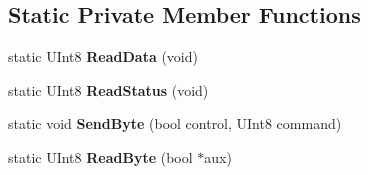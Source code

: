 \subsection*{Static Private Member Functions}
\begin{DoxyCompactItemize}
\item 
\mbox{\label{class_standard_p_c___internal_1_1_p_s2_controller_ac2fc01063fefe1e64ef7935993a8fa55}} 
static U\+Int8 {\bfseries Read\+Data} (void)
\item 
\mbox{\label{class_standard_p_c___internal_1_1_p_s2_controller_a0402a9dee2384014c51569610e0b388d}} 
static U\+Int8 {\bfseries Read\+Status} (void)
\item 
\mbox{\label{class_standard_p_c___internal_1_1_p_s2_controller_afa03a1342e7758e5213e6c88ea0ebf57}} 
static void {\bfseries Send\+Byte} (bool control, U\+Int8 command)
\item 
\mbox{\label{class_standard_p_c___internal_1_1_p_s2_controller_ac7b1be0720854698814168ecb8e2143c}} 
static U\+Int8 {\bfseries Read\+Byte} (bool $\ast$aux)
\end{DoxyCompactItemize}
